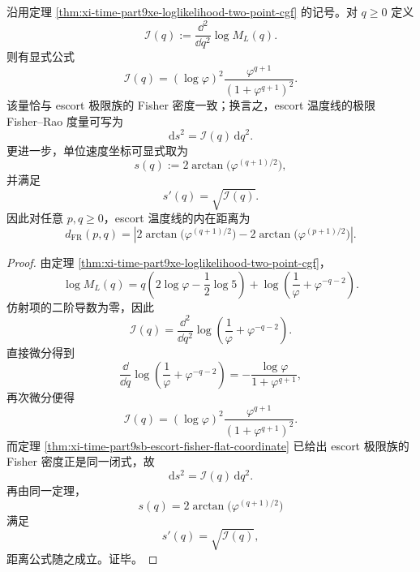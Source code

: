 \begin{theorem}\label{thm:xi-time-part9xe-escort-fisher-likelihood-curvature}
沿用定理 \ref{thm:xi-time-part9xe-loglikelihood-two-point-cgf} 的记号。对 \(q\ge 0\) 定义
\[
\mathcal I(q):=\frac{\dd^2}{\dd q^2}\log M_L(q).
\]
则有显式公式
\[
\mathcal I(q)
=
(\log\varphi)^2\frac{\varphi^{q+1}}{(1+\varphi^{q+1})^2}.
\]
该量恰与 escort 极限族的 Fisher 密度一致；换言之，escort 温度线的极限 Fisher--Rao 度量可写为
\[
\mathrm ds^2=\mathcal I(q)\,\mathrm dq^2.
\]
更进一步，单位速度坐标可显式取为
\[
s(q):=2\arctan\!\bigl(\varphi^{(q+1)/2}\bigr),
\]
并满足
\[
s'(q)=\sqrt{\mathcal I(q)}.
\]
因此对任意 \(p,q\ge 0\)，escort 温度线的内在距离为
\[
d_{\mathrm{FR}}(p,q)
=
\left|
2\arctan\!\bigl(\varphi^{(q+1)/2}\bigr)
-
2\arctan\!\bigl(\varphi^{(p+1)/2}\bigr)
\right|.
\]
\end{theorem}
\begin{proof}
由定理 \ref{thm:xi-time-part9xe-loglikelihood-two-point-cgf}，
\[
\log M_L(q)
=
q\left(2\log\varphi-\frac12\log 5\right)
+\log\!\left(\frac1\varphi+\varphi^{-q-2}\right).
\]
仿射项的二阶导数为零，因此
\[
\mathcal I(q)
=
\frac{\dd^2}{\dd q^2}
\log\!\left(\frac1\varphi+\varphi^{-q-2}\right).
\]
直接微分得到
\[
\frac{\dd}{\dd q}
\log\!\left(\frac1\varphi+\varphi^{-q-2}\right)
=
-\frac{\log\varphi}{1+\varphi^{q+1}},
\]
再次微分便得
\[
\mathcal I(q)
=
(\log\varphi)^2\frac{\varphi^{q+1}}{(1+\varphi^{q+1})^2}.
\]
而定理 \ref{thm:xi-time-part9sb-escort-fisher-flat-coordinate} 已给出 escort 极限族的 Fisher 密度正是同一闭式，故
\[
\mathrm ds^2=\mathcal I(q)\,\mathrm dq^2.
\]
再由同一定理，
\[
s(q)=2\arctan\!\bigl(\varphi^{(q+1)/2}\bigr)
\]
满足
\[
s'(q)=\sqrt{\mathcal I(q)},
\]
距离公式随之成立。证毕。
\end{proof}

